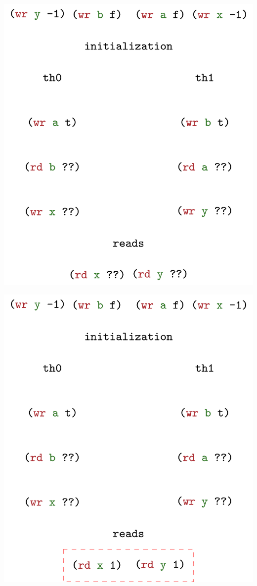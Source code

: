\documentclass[aspectratio=1610, xcolor={dvipsnames}]{beamer}
\begin{document}
\begin{frame}
    \centering
    
    \includegraphics[height=0.9\textheight]{fig/trace5-11-0.jpg}

\end{frame}

\begin{frame}
    \centering
    
    \includegraphics[height=0.9\textheight]{fig/trace5-11-1.jpg}

\end{frame}
\end{document}

